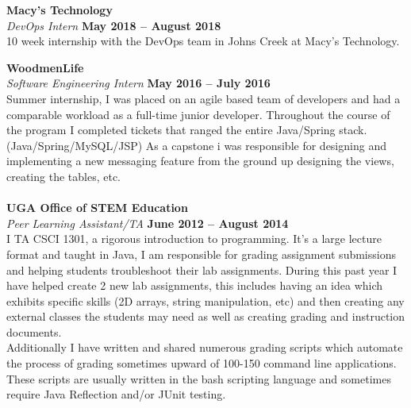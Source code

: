 \documentclass[margin,line]{resume}
\begin{document}
\begin{resume}
    \textbf{\listing Macy's Technology} \vspace{2mm}\\\vspace{1mm}%
    \textsl{DevOps Intern} \hfill \textbf{May 2018 -- August 2018}\\
    10 week internship with the DevOps team in Johns Creek at Macy's Technology.

    \textbf{\listing WoodmenLife} \vspace{2mm}\\\vspace{1mm}%
    \textsl{Software Engineering Intern} \hfill \textbf{May 2016 -- July 2016}\\
    Summer internship, I was placed on an agile based team of developers and
had a comparable workload as a full-time junior developer.
Throughout the course of the program I completed tickets that ranged the entire
Java/Spring stack. (Java/Spring/MySQL/JSP)
As a capstone i was responsible for designing and implementing a new messaging feature from the ground up
designing the views, creating the tables, etc.
\\\\
    \textbf{\listing UGA Office of STEM Education} \vspace{2mm}\\\vspace{1mm}%
    \textsl{Peer Learning Assistant/TA} \hfill \textbf{June 2012 -- August 2014}\\
    I TA CSCI 1301, a rigorous introduction to programming. It's a large lecture format and taught in Java, I am responsible for
grading assignment submissions and helping students troubleshoot their lab assignments.
During this past year I have helped create 2 new lab assignments, this includes having an idea which exhibits specific skills (2D arrays, string manipulation, etc) and then creating any external classes the students may need as well as creating grading and instruction documents.\\ 
Additionally I have written and shared numerous grading scripts which automate the process of grading sometimes upward of 100-150 command line applications. These scripts are usually written in the bash scripting language and sometimes require Java Reflection and/or JUnit testing.


\sectionline

   

\end{resume}
\end{document}
